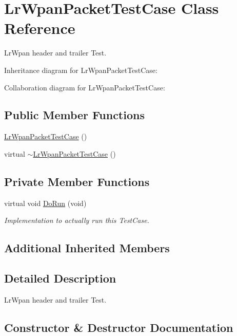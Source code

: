 \hypertarget{classLrWpanPacketTestCase}{}\section{Lr\+Wpan\+Packet\+Test\+Case Class Reference}
\label{classLrWpanPacketTestCase}


Lr\+Wpan header and trailer Test.  




Inheritance diagram for Lr\+Wpan\+Packet\+Test\+Case\+:


Collaboration diagram for Lr\+Wpan\+Packet\+Test\+Case\+:
\subsection*{Public Member Functions}
\begin{DoxyCompactItemize}
\item 
\hyperlink{classLrWpanPacketTestCase_ad51f721b6c0213c92b22e7f3f7342f94}{Lr\+Wpan\+Packet\+Test\+Case} ()
\item 
virtual \hyperlink{classLrWpanPacketTestCase_aacb4e0d3ffb1d6bda96d1006470a4e5e}{$\sim$\+Lr\+Wpan\+Packet\+Test\+Case} ()
\end{DoxyCompactItemize}
\subsection*{Private Member Functions}
\begin{DoxyCompactItemize}
\item 
virtual void \hyperlink{classLrWpanPacketTestCase_ae85f64d48a71983a4a43f49e5571546a}{Do\+Run} (void)
\begin{DoxyCompactList}\small\item\em Implementation to actually run this Test\+Case. \end{DoxyCompactList}\end{DoxyCompactItemize}
\subsection*{Additional Inherited Members}


\subsection{Detailed Description}
Lr\+Wpan header and trailer Test. 

\subsection{Constructor \& Destructor Documentation}
